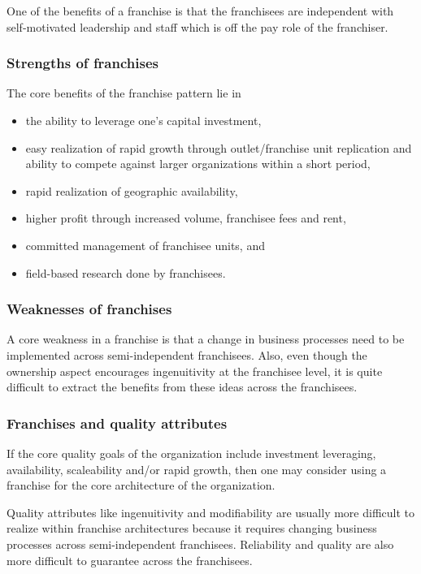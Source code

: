 \documentclass[11pt,english,a4]{article}
\begin{document}
One of the benefits of a franchise is that the franchisees are independent with self-motivated leadership and staff which is off the pay role of the franchiser.

\subsubsection{Strengths of franchises}

The core benefits of the franchise pattern lie in 
\begin{itemize}
  \item the ability to leverage one's capital investment,
  \item easy realization of rapid growth through outlet/franchise unit replication and ability to compete against larger organizations within a short period,
  \item rapid realization of geographic availability,
  \item higher profit through increased volume, franchisee fees and rent,
  \item committed management of franchisee units, and
  \item field-based research done by franchisees.
\end{itemize}

\subsubsection{Weaknesses of franchises}

A core weakness in a franchise is that a change in business processes need to be implemented across semi-independent franchisees. Also, even though the ownership aspect encourages ingenuitivity at the franchisee level, it is quite difficult to extract the benefits from these ideas across the franchisees.

\subsubsection{Franchises and quality attributes}

If the core quality goals of the organization include investment leveraging, availability, scaleability and/or rapid growth, then one may consider using a franchise for the core architecture of the organization.

Quality attributes like ingenuitivity and modifiability are usually more difficult to realize within franchise architectures because it requires changing business processes across semi-independent franchisees. Reliability and quality are also more difficult to guarantee across the franchisees.
\end{document}
